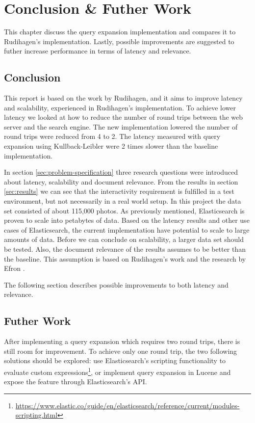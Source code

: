 \chapter{Conclusion \& Futher Work}
\label{ch:conclusion}
This chapter discuss the query expansion implementation and compares it to Rudihagen's implementation.
Lastly, possible improvements are suggested to futher increase performance in terms of latency and relevance.

\section{Conclusion}
This report is based on the work by Rudihagen, and it aims to improve latency and scalability, experienced in Rudihagen's implementation.
To achieve lower latency we looked at how to reduce the number of round trips between the web server and the search engine.
The new implementation lowered the number of round trips were reduced from 4 to 2.
The latency measured with query expansion using Kullback-Leibler were 2 times slower than the baseline implementation.

In section \ref{sec:problem-specification} three research questions were introduced about latency, scalability and document relevance.
From the results in section \ref{sec:results} we can see that the interactivity requirement is fulfilled in a test environment,
but not necessarily in a real world setup.
In this project the data set consisted of about 115,000 photos.
As previously mentioned, Elasticsearch is proven to scale into petabytes of data.
Based on the latency results and other use cases of Elasticsearch,
the current implementation have potential to scale to large amounts of data.
Before we can conclude on scalability, a larger data set should be tested.
Also, the document relevance of the results assumes to be better than the baseline.
This assumption is based on Rudihagen's work and the research by Efron \cite{ir-hashtag}.

The following section describes possible improvements to both latency and relevance.

\section{Futher Work}
After implementing a query expansion which requires two round trips, there is still room for improvement.
To achieve only one round trip, the two following solutions should be explored:
use Elasticsearch's scripting functionality to evaluate custom expressions\footnote{\url{https://www.elastic.co/guide/en/elasticsearch/reference/current/modules-scripting.html}},
or implement query expansion in Lucene and expose the feature through Elasticsearch's API.

